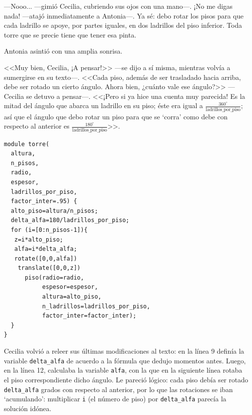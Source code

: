 ---Nooo... ---gimió Cecilia, cubriendo sus ojos con una mano---. ¡No
me digas nada! ---atajó inmediatamente a An\-to\-\mbox{nia---.} Ya sé:
debo rotar los pisos para que cada ladrillo se apoye, por partes
iguales, en dos ladrillos del piso inferior. Toda torre que se precie
tiene que tener esa pinta.
    
Antonia asintió con una amplia sonrisa.

<<Muy bien, Cecilia, ¡A pensar!>> ---se dijo a sí misma,
  mientras volvía a sumergirse en su texto---. <<Cada piso,
    además de ser trasladado hacia arriba, debe ser rotado un cierto
    ángulo. Ahora bien, ¿cuánto vale ese ángulo?>> ---Cecilia se
  detuvo a pensar---. <<¡Pero si ya hice una cuenta muy parecida!
    Es la mitad del ángulo que abarca un ladrillo en su piso; éste era
    igual a $\frac{360^{\circ}}{\text{ladrillos\_por\_piso}}$; así que
    el ángulo que debo rotar un piso para que se `corra' como debe con
    respecto al anterior es
    $\frac{180^{\circ}}{\text{ladrillos\_por\_piso}}$>>.
  

    \begin{lstlisting}
module torre(
  altura,
  n_pisos,
  radio,
  espesor,
  ladrillos_por_piso,
  factor_inter=.95) {
  alto_piso=altura/n_pisos;
  delta_alfa=180/ladrillos_por_piso;
  for (i=[0:n_pisos-1]){
   z=i*alto_piso;
   alfa=i*delta_alfa;
   rotate([0,0,alfa])
    translate([0,0,z])
      piso(radio=radio,
           espesor=espesor,
           altura=alto_piso,        
           n_ladrillos=ladrillos_por_piso,
           factor_inter=factor_inter);
  }
}    \end{lstlisting}
%

Cecilia volvió a releer sus últimas modificaciones al texto: en la
línea 9 definía la variable \lstinline!delta_alfa! de acuerdo a la
fórmula que dedujo momentos antes. Luego, en la línea 12, calculaba la
variable \lstinline!alfa!, con la que en la siguiente línea rotaba el
piso correspondiente dicho ángulo. Le pareció lógico: cada piso debía
ser rotado \lstinline!delta_alfa! grados con respecto al anterior, por
lo que las rotaciones se iban `acumulando': multiplicar \texttt{i} (el
número de piso) por \lstinline!delta_alfa! parecía la solución idónea.

